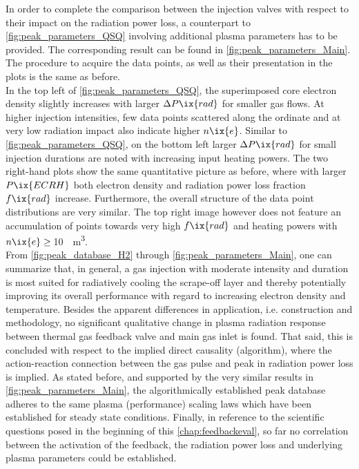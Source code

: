%
        In order to complete the comparison between the injection valves with respect to their impact on the radiation power loss, a counterpart to \cref{fig:peak_parameters_QSQ} involving additional plasma parameters has to be provided. The corresponding result can be found in \cref{fig:peak_parameters_Main}. The procedure to acquire the data points, as well as their presentation in the plots is the same as before.\\%
        In the top left of \cref{fig:peak_parameters_QSQ}, the superimposed core electron density slightly increases with larger $\Delta P\ix{rad}$ for smaller gas flows. At higher injection intensities, few data points scattered along the ordinate and at very low radiation impact also indicate higher $n\ix{e}$. Similar to \cref{fig:peak_parameters_QSQ}, on the bottom left larger $\Delta P\ix{rad}$ for small injection durations are noted with increasing input heating powers. The two right-hand plots show the same quantitative picture as before, where with larger $P\ix{ECRH}$ both electron density and radiation power loss fraction $f\ix{rad}$ increase. Furthermore, the overall structure of the data point distributions are very similar. The top right image however does not feature an accumulation of points towards very high $f\ix{rad}$ and heating powers with $n\ix{e}\ge\,$\SI{10}{\per\cubic\meter}.\\%
        From \cref{fig:peak_database_H2} through \cref{fig:peak_parameters_Main}, one can summarize that, in general, a gas injection with moderate intensity and duration is most suited for radiatively cooling the scrape-off layer and thereby potentially improving its overall performance with regard to increasing electron density and temperature. Besides the apparent differences in application, i.e. construction and methodology, no significant qualitative change in plasma radiation response between thermal gas feedback valve and main gas inlet is found. That said, this is concluded with respect to the implied direct causality (algorithm), where the action-reaction connection between the gas pulse and peak in radiation power loss is implied. As stated before, and supported by the very similar results in \cref{fig:peak_parameters_Main}, the algorithmically established peak database adheres to the same plasma (performance) scaling laws which have been established for steady state conditions. Finally, in reference to the scientific questions posed in the beginning of this \cref{chap:feedbackeval}, so far no correlation between the activation of the feedback, the radiation power loss and underlying plasma parameters could be established.%

